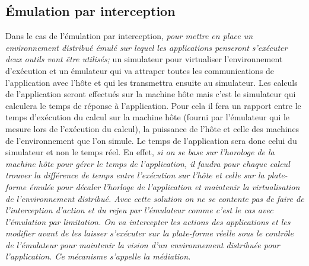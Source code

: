 \subsection{Émulation par interception}

Dans le cas de l'émulation par interception, \textit{pour mettre en place un
  environnement distribué émulé sur lequel les applications penseront
  s'exécuter deux outils vont être utilisés;} un simulateur pour virtualiser
l'environnement d'exécution et un émulateur qui va attraper toutes les
communications de l'application avec l'hôte et qui les transmettra ensuite au
simulateur. Les calculs de l'application seront effectués sur la machine hôte
mais c'est le simulateur qui calculera le temps de réponse à l'application. Pour
cela il fera un rapport entre le temps d'exécution du calcul sur la machine hôte
(fourni par l'émulateur qui le mesure lors de l'exécution du calcul), la
puissance de l'hôte et celle des machines de l'environnement que l'on simule. Le
temps de l'application sera donc celui du simulateur et non le temps réel. En
effet, \textit{si on se base sur l'horologe de la machine hôte pour gérer le
  temps de l'application, il faudra pour chaque calcul trouver la différence de
  temps entre l'exécution sur l'hôte et celle sur la plate-forme émulée pour
  décaler l'horloge de l'application et maintenir la virtualisation de
  l'environnement distribué. Avec cette solution on ne se contente pas de faire
  de l'interception d'action et du rejeu par l'émulateur comme c'est le cas avec
  l'émulation par limitation. On va intercepter les actions des applications et
  les modifier avant de les laisser s'exécuter sur la plate-forme réelle sous le
  contrôle de l'émulateur pour maintenir la vision d'un environnement distribuée
  pour l'application. Ce mécanisme s'appelle la médiation.}

